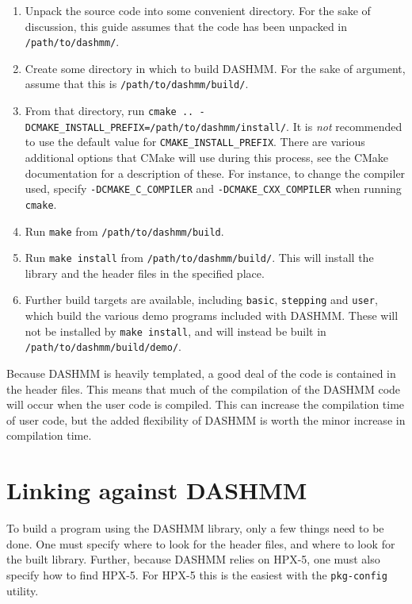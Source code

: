 \begin{enumerate}
\item Unpack the source code into some convenient directory. For the
  sake of discussion, this guide assumes that the code has been
  unpacked in {\tt /path/to/dashmm/}.
\item Create some directory in which to build DASHMM. For the sake of argument,
  assume that this is {\tt /path/to/dashmm/build/}.
\item From that directory, run {\tt cmake .. -DCMAKE\_INSTALL\_PREFIX=/path/to/dashmm/install/}. It is \emph{not} recommended to use the default value for {\tt CMAKE\_INSTALL\_PREFIX}.  There are various additional options that
  CMake will use during this process, see the CMake documentation for a
  description of these. For instance, to change the compiler used,
  specify {\tt -DCMAKE\_C\_COMPILER} and {\tt -DCMAKE\_CXX\_COMPILER} when running
  {\tt cmake}.
\item Run {\tt make} from {\tt /path/to/dashmm/build}.
\item Run {\tt make install} from {\tt /path/to/dashmm/build/}. This will
  install the library and the header files in the specified place.
\item Further build targets are available, including
  {\tt basic}, {\tt stepping} and {\tt user}, which build the various demo programs
  included with DASHMM. These will not be installed by {\tt make install}, and
  will instead be built in {\tt /path/to/dashmm/build/demo/}.
\end{enumerate}

Because DASHMM is heavily templated, a good deal of the code is
contained in the header files. This means that much of the compilation
of the DASHMM code will occur when the user code is compiled. This can
increase the compilation time of user code, but the added flexibility
of DASHMM is worth the minor increase in compilation time.

\section{Linking against DASHMM}

To build a program using the DASHMM library, only a few things need to
be done. One must specify where to look for the header files, and
where to look for the built library. Further, because DASHMM relies on
HPX-5, one must also specify how to find HPX-5. For HPX-5 this is the
easiest with the {\tt pkg-config} utility.


